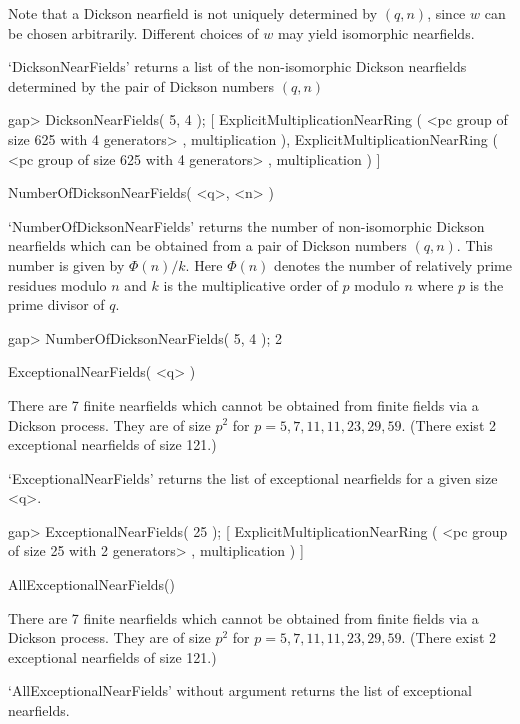 Note that a Dickson nearfield is not uniquely determined by $(q,n)$, since
$w$ can be chosen arbitrarily. Different choices of $w$ may yield isomorphic 
nearfields.

`DicksonNearFields' returns a list of the non-isomorphic Dickson nearfields
determined by the pair of Dickson numbers $(q,n)$

\beginexample
    gap> DicksonNearFields( 5, 4 );
    [ ExplicitMultiplicationNearRing ( <pc group of size 625 with 
        4 generators> , multiplication ), 
      ExplicitMultiplicationNearRing ( <pc group of size 625 with 
        4 generators> , multiplication ) ]
\endexample

\>NumberOfDicksonNearFields( <q>, <n> )

`NumberOfDicksonNearFields' returns the number of non-isomorphic Dickson
nearfields which can be obtained from a pair of Dickson numbers $(q,n)$.
This number is given by $\Phi(n)/k$. Here $\Phi(n)$ denotes the number
of relatively prime residues modulo $n$ and $k$ is the multiplicative order 
of $p$ modulo $n$ where $p$ is the prime divisor of $q$.

\beginexample
    gap> NumberOfDicksonNearFields( 5, 4 );
    2
\endexample



\>ExceptionalNearFields( <q> )

There are 7 finite nearfields which cannot be obtained from finite fields
via a Dickson process. They are of size $p^2$ for
$p = 5, 7, 11, 11, 23, 29, 59$. (There exist 2 exceptional nearfields of size
121.)

`ExceptionalNearFields' returns the list of exceptional nearfields for a given
size <q>.

\beginexample
    gap> ExceptionalNearFields( 25 );
    [ ExplicitMultiplicationNearRing ( <pc group of size 25 with 
        2 generators> , multiplication ) ]
\endexample

\>AllExceptionalNearFields()

There are 7 finite nearfields which cannot be obtained from finite fields
via a Dickson process. They are of size $p^2$ for
$p = 5, 7, 11, 11, 23, 29, 59$. (There exist 2 exceptional nearfields of size
121.)

`AllExceptionalNearFields' without argument returns the list of exceptional
nearfields.

